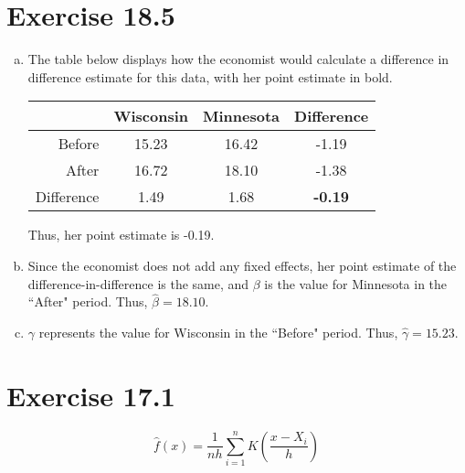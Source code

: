 \documentclass{article}
\newcommand{\bhat}{\hat{\beta}}
\begin{document}

\section*{Exercise 18.5}

\begin{enumerate}[(a)]
	\item The table below displays how the economist would calculate a difference in difference estimate for this data, with her point estimate in bold.
		\begin{center}
			\begin{tabular}{r|cc|c}
						& Wisconsin	& Minnesota & Difference	\\\hline 
			Before		& 15.23		& 16.42		& -1.19			\\
			After		& 16.72		& 18.10		& -1.38			\\\hline 
			Difference 	& 1.49		& 1.68		& \textbf{-0.19}
			\end{tabular}
		\end{center}
		Thus, her point estimate is -0.19.
	
	\item Since the economist does not add any fixed effects, her point estimate of the difference-in-difference is the same, and $\beta$ is the value for Minnesota in the ``After" period. Thus, ${\bhat=18.10}$.
	
	\item $\gamma$ represents the value for Wisconsin in the ``Before" period. Thus, ${\hat{\gamma}=15.23}$.
	
\end{enumerate}


\section*{Exercise 17.1}

$$ \hat{f}(x) = \frac{1}{nh}\sum_{i=1}^n K\left(\frac{x-X_i}{h}\right) $$
\end{document}
